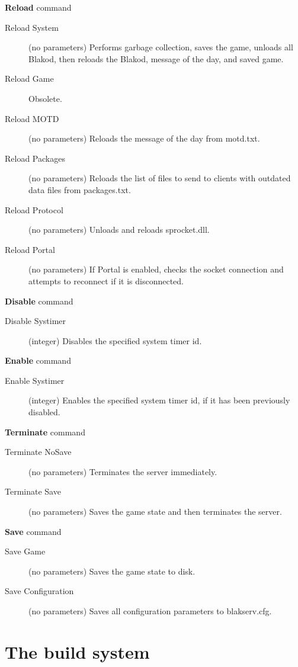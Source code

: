 \textbf{Reload} command
\begin{description}
\item[Reload System] (no parameters) Performs garbage collection, saves the game, unloads all
Blakod, then reloads the Blakod, message of the day, and saved game.
\item[Reload Game] Obsolete.
\item[Reload MOTD] (no parameters) Reloads the message of the day from motd.txt.
\item[Reload Packages] (no parameters) Reloads the list of files to send to clients 
with outdated
data files from packages.txt.
\item[Reload Protocol] (no parameters) Unloads and reloads sprocket.dll.
\item[Reload Portal] (no parameters) If Portal is enabled, checks the socket connection
and attempts to reconnect if it is disconnected.
\end{description}

\textbf{Disable} command
\begin{description}
\item[Disable Systimer] (integer) Disables the specified system timer id.
\end{description}

\textbf{Enable} command
\begin{description}
\item[Enable Systimer] (integer) Enables the specified system timer id, if it has
been previously disabled.
\end{description}

\textbf{Terminate} command
\begin{description}
\item[Terminate NoSave] (no parameters) Terminates the server immediately.
\item[Terminate Save] (no parameters) Saves the game state and then terminates the server.
\end{description}

\textbf{Save} command
\begin{description}
\item[Save Game] (no parameters) Saves the game state to disk.
\item[Save Configuration] (no parameters) Saves all configuration parameters
to blakserv.cfg.
\end{description}

\section{The build system}
\label{sec:build}

